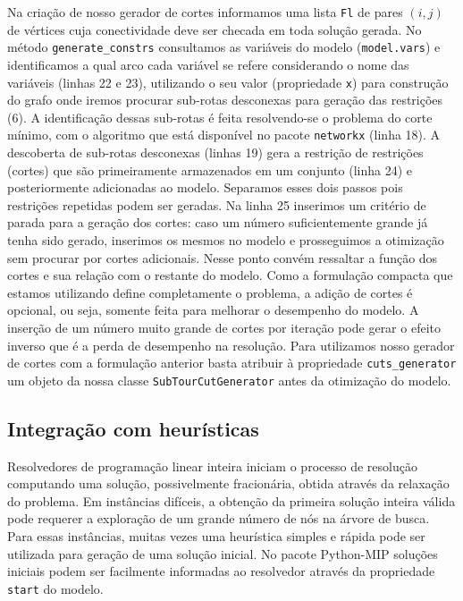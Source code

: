 \documentclass[a4paper,11pt,fleqn]{article}
\begin{document}
Na criação de nosso gerador de cortes informamos uma lista \texttt{Fl} de pares $(i,j)$ de vértices cuja conectividade deve ser checada em toda solução gerada. No método \texttt{generate\_constrs} consultamos as variáveis do modelo (\texttt{model.vars}) e identificamos a qual arco cada variável se refere considerando o nome das variáveis (linhas 22 e  23), utilizando o seu valor (propriedade \texttt{x}) para construção do grafo onde iremos procurar sub-rotas desconexas para geração das restrições (6). A identificação dessas sub-rotas é feita resolvendo-se o problema do corte mínimo, com o algoritmo que está disponível no pacote \texttt{networkx} (linha 18). A descoberta de sub-rotas desconexas (linhas 19) gera a restrição de restrições (cortes) que são primeiramente armazenados em um conjunto (linha 24) e posteriormente adicionadas ao modelo. Separamos esses dois passos pois restrições repetidas podem ser geradas. Na linha 25 inserimos um critério de parada para a geração dos cortes: caso um número suficientemente grande já tenha sido gerado, inserimos os mesmos no modelo e prosseguimos a otimização sem procurar por cortes adicionais. Nesse ponto convém ressaltar a função dos cortes e sua relação com o restante do modelo. Como a formulação compacta que estamos utilizando define completamente o problema, a adição de cortes é opcional, ou seja, somente feita para melhorar o desempenho do modelo. A inserção de um número muito grande de cortes por iteração pode gerar o efeito inverso que é a perda de desempenho na resolução. Para utilizamos nosso gerador de cortes com a formulação anterior basta atribuir à propriedade \texttt{cuts\_generator} um objeto da nossa classe \texttt{SubTourCutGenerator} antes da otimização do modelo.

\subsection{Integração com heurísticas}

Resolvedores de programação linear inteira iniciam o processo de resolução computando uma solução, possivelmente fracionária, obtida através da relaxação do problema. Em instâncias difíceis, a obtenção da primeira solução inteira válida pode requerer a exploração de um grande número de nós na árvore de busca. Para essas instâncias, muitas vezes uma heurística simples e rápida pode ser utilizada para geração de uma solução inicial. No pacote Python-MIP soluções iniciais podem ser facilmente informadas ao resolvedor através da propriedade \texttt{start} do modelo.
		


\end{document}
